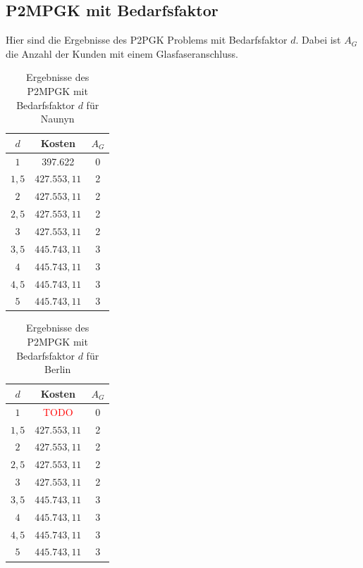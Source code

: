 \documentclass[11pt,a4paper]{article}
\newcommand{\TODO}{\textcolor{red}{TODO}}
\theoremstyle{my_th_style1}
\begin{document}
\vspace{3cm}

\subsection*{P2MPGK mit Bedarfsfaktor}
Hier sind die Ergebnisse des P2PGK Problems mit Bedarfsfaktor $d$. Dabei ist $A_G$ die Anzahl der Kunden mit einem Glasfaseranschluss.
\begin{table}[!htbp]
	\centering
		\begin{tabular}{c|c|c}
	\centering
	$d$ & Kosten & $A_G$ \\	
	\hline
	$1$   	 &  397.622 & 0  \\
	$1,5$ 	&   $427.553,11$  & 2  \\
	$2$   	&   $427.553,11$ & 2  \\
	$2,5$   	&   $427.553,11$ & 2  \\
	$3$    &   $427.553,11$ & 2  \\
	$3,5$   	&   $445.743,11$ & 3  \\
	$4$   	&   $445.743,11$& 3  \\
	$4,5$    & $445.743,11$ & 3 \\
	$5$   	&   $445.743,11$& 3  \\
\end{tabular}
	\caption{Ergebnisse des P2MPGK mit Bedarfsfaktor $d$ f\"ur Naunyn}
	\label{P2MPGKBedarfN} 
\end{table}

\begin{table}[!htbp]
			\centering
			\begin{tabular}{c|c|c}
				\centering
				$d$ & Kosten & $A_G$ \\	
		\hline
	$1$   	 &  \TODO& 0  \\
	$1,5$ 	&   $427.553,11$  & 2  \\
	$2$   	&   $427.553,11$ & 2  \\
	$2,5$   	&   $427.553,11$ & 2  \\
	$3$    &   $427.553,11$ & 2  \\
	$3,5$   	&   $445.743,11$ & 3  \\
	$4$   	&   $445.743,11$& 3  \\
	$4,5$    & $445.743,11$ & 3 \\
	$5$   	&   $445.743,11$& 3  \\	
			\end{tabular}
			\caption{Ergebnisse des P2MPGK mit Bedarfsfaktor $d$ f\"ur Berlin} 
			\label{P2MPGKBedarfB}
\end{table}
\end{document}
